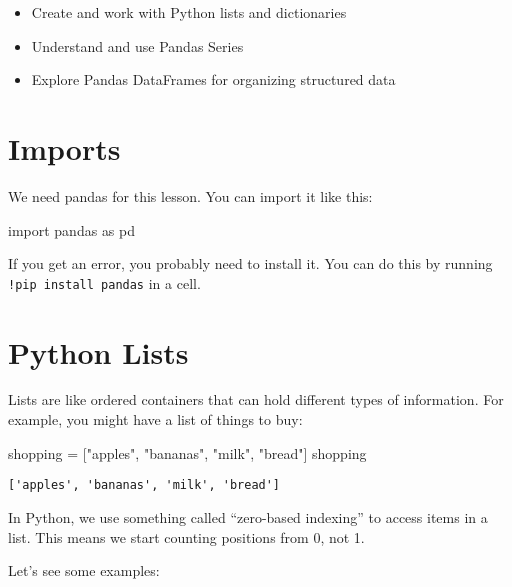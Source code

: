 \documentclass[
  letterpaper,
  DIV=11,
  numbers=noendperiod]{scrreprt}
\newenvironment{Shaded}{\begin{snugshade}}{\end{snugshade}}
\newcommand{\ImportTok}[1]{\textcolor[rgb]{0.00,0.46,0.62}{#1}}
\newcommand{\NormalTok}[1]{\textcolor[rgb]{0.00,0.23,0.31}{#1}}
\newcommand{\OperatorTok}[1]{\textcolor[rgb]{0.37,0.37,0.37}{#1}}
\newcommand{\StringTok}[1]{\textcolor[rgb]{0.13,0.47,0.30}{#1}}
\providecommand{\tightlist}{%
  \setlength{\itemsep}{0pt}\setlength{\parskip}{0pt}}\usepackage{longtable,booktabs,array}
\begin{document}
\begin{itemize}
\tightlist
\item
  Create and work with Python lists and dictionaries
\item
  Understand and use Pandas Series
\item
  Explore Pandas DataFrames for organizing structured data
\end{itemize}

\section{Imports}\label{imports}

We need pandas for this lesson. You can import it like this:

\begin{Shaded}
\begin{Highlighting}[]
\ImportTok{import}\NormalTok{ pandas }\ImportTok{as}\NormalTok{ pd}
\end{Highlighting}
\end{Shaded}

If you get an error, you probably need to install it. You can do this by
running \texttt{!pip\ install\ pandas} in a cell.

\section{Python Lists}\label{python-lists}

Lists are like ordered containers that can hold different types of
information. For example, you might have a list of things to buy:

\begin{Shaded}
\begin{Highlighting}[]
\NormalTok{shopping }\OperatorTok{=}\NormalTok{ [}\StringTok{"apples"}\NormalTok{, }\StringTok{"bananas"}\NormalTok{, }\StringTok{"milk"}\NormalTok{, }\StringTok{"bread"}\NormalTok{] }
\NormalTok{shopping}
\end{Highlighting}
\end{Shaded}

\begin{verbatim}
['apples', 'bananas', 'milk', 'bread']
\end{verbatim}

In Python, we use something called ``zero-based indexing'' to access
items in a list. This means we start counting positions from 0, not 1.

Let's see some examples:
\end{document}
